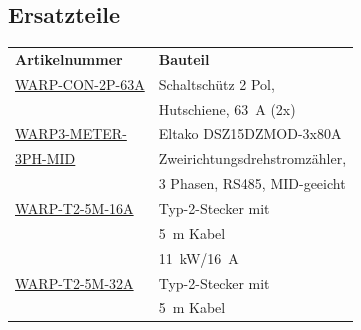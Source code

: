 \documentclass[a4paper,10pt]{article}
\begin{document}
\begin{multicols*}{2}
    \subsection{Ersatzteile}
	\small{
    \begin{tabular}{ll}
        \toprule
        \textbf{Artikelnummer}                                                                                                      & \textbf{Bauteil}                     \\
        \cmidrule(lr{0.5em}){1-2}
        \href{https://www.tinkerforge.com/de/shop/warp/warp3-spare-parts/}{WARP-CON-2P-63A}											& Schaltschütz 2 Pol,                  \\
                                                                                                                                    & Hutschiene, \SI{63}{\ampere} (2x)\\
        \cmidrule(lr{0.5em}){1-2}
        \href{https://www.tinkerforge.com/de/shop/warp/warp3-spare-parts/}{WARP3-METER-}										    & Eltako DSZ15DZMOD-3x80A               \\
        \href{https://www.tinkerforge.com/de/shop/warp/warp3-spare-parts/}{3PH-MID}                                                 & Zweirichtungsdrehstromzähler,                     \\
                                                                                                                                    & 3	Phasen, RS485, MID-geeicht\\
        \cmidrule(lr{0.5em}){1-2}
        \href{https://www.tinkerforge.com/de/shop/warp/warp3-spare-parts/}{WARP-T2-5M-16A}											& Typ-2-Stecker mit                    \\
                                                                                                                                    & \SI{5}{\meter} Kabel                 \\
                                                                                                                                    & \SI{11}{\kilo\watt}/\SI{16}{\ampere} \\
        \cmidrule(lr{0.5em}){1-2}
        \href{https://www.tinkerforge.com/de/shop/warp/warp3-spare-parts/}{WARP-T2-5M-32A}			   								& Typ-2-Stecker mit                    \\
                                                                                                                                    & \SI{5}{\meter} Kabel                 \\

\end{tabular}}
\end{multicols*}
\end{document}
